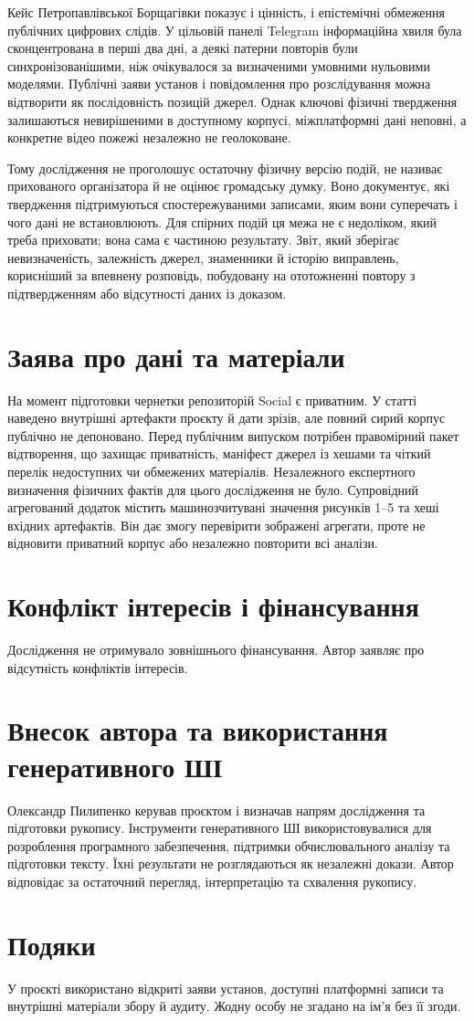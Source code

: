 Кейс Петропавлівської Борщагівки показує і цінність, і епістемічні обмеження публічних цифрових слідів. У цільовій панелі Telegram інформаційна хвиля була сконцентрована в перші два дні, а деякі патерни повторів були синхронізованішими, ніж очікувалося за визначеними умовними нульовими моделями. Публічні заяви установ і повідомлення про розслідування можна відтворити як послідовність позицій джерел. Однак ключові фізичні твердження залишаються невирішеними в доступному корпусі, міжплатформні дані неповні, а конкретне відео пожежі незалежно не геолоковане.

Тому дослідження не проголошує остаточну фізичну версію подій, не називає прихованого організатора й не оцінює громадську думку. Воно документує, які твердження підтримуються спостережуваними записами, яким вони суперечать і чого дані не встановлюють. Для спірних подій ця межа не є недоліком, який треба приховати; вона сама є частиною результату. Звіт, який зберігає невизначеність, залежність джерел, знаменники й історію виправлень, корисніший за впевнену розповідь, побудовану на ототожненні повтору з підтвердженням або відсутності даних із доказом.

\section*{Заява про дані та матеріали}
На момент підготовки чернетки репозиторій Social є приватним. У статті наведено внутрішні артефакти проєкту й дати зрізів, але повний сирий корпус публічно не депоновано. Перед публічним випуском потрібен правомірний пакет відтворення, що захищає приватність, маніфест джерел із хешами та чіткий перелік недоступних чи обмежених матеріалів. Незалежного експертного визначення фізичних фактів для цього дослідження не було. Супровідний агрегований додаток містить машинозчитувані значення рисунків 1–5 та хеші вхідних артефактів. Він дає змогу перевірити зображені агрегати, проте не відновити приватний корпус або незалежно повторити всі аналізи.

\section*{Конфлікт інтересів і фінансування}
Дослідження не отримувало зовнішнього фінансування. Автор заявляє про відсутність конфліктів інтересів.

\section*{Внесок автора та використання генеративного ШІ}
Олександр Пилипенко керував проєктом і визначав напрям дослідження та підготовки рукопису. Інструменти генеративного ШІ використовувалися для розроблення програмного забезпечення, підтримки обчислювального аналізу та підготовки тексту. Їхні результати не розглядаються як незалежні докази. Автор відповідає за остаточний перегляд, інтерпретацію та схвалення рукопису.

\section*{Подяки}
У проєкті використано відкриті заяви установ, доступні платформні записи та внутрішні матеріали збору й аудиту. Жодну особу не згадано на ім'я без її згоди.
